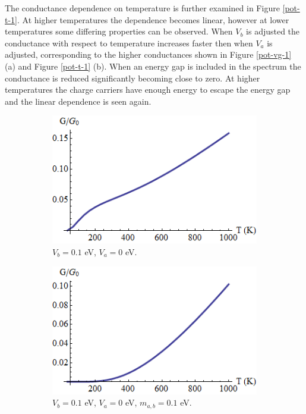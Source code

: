 	The conductance dependence on temperature is further examined in Figure \ref{pot-t-1}. At higher temperatures the dependence becomes linear, however at lower temperatures some differing properties can be observed. When $V_{b}$ is adjusted the conductance with respect to temperature increases faster then when $V_{a}$ is adjusted, corresponding to the higher conductances shown in Figure \ref{pot-vg-1} (a) and Figure \ref{pot-t-1} (b). When an energy gap is included in the spectrum the conductance is reduced significantly becoming close to zero. At higher temperatures the charge carriers have enough energy to escape the energy gap and the linear dependence is seen again.
		\begin{figure}[h]
			 \begin{subfigure}[h]{0.3\textwidth}
				\centerline{\includegraphics[scale=0.35]{images/pot-t-1}}
				\caption{$V_{b}=0.1$ eV, $V_{a}=0$ eV.}
			\end{subfigure}
			\hspace{0.5cm}
			\begin{subfigure}[h]{0.3\textwidth}
				\centerline{\includegraphics[scale=0.35]{images/pot-t-2}}
				\caption{$V_{b}=0.1$ eV, $V_{a}=0$ eV, $m_{a,b}=0.1$ eV.}
			\end{subfigure}
			\hspace{0.5cm}
			\begin{subfigure}[h]{0.3\textwidth}

\end{subfigure}
\end{figure}
